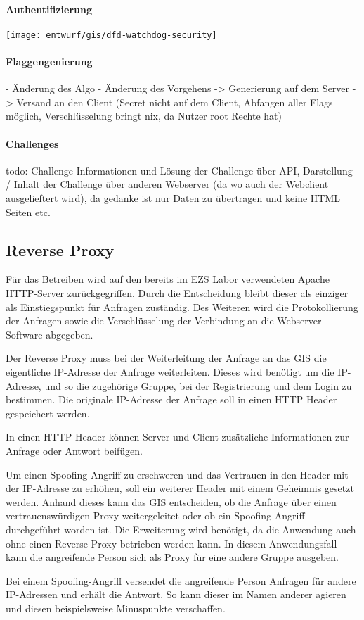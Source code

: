 \paragraph{Authentifizierung}

\texttt{[image: entwurf/gis/dfd-watchdog-security]}

\paragraph{Flaggengenierung}
- Änderung des Algo
- Änderung des Vorgehens -> Generierung auf dem Server -> Versand an den Client (Secret nicht auf dem Client, Abfangen aller Flags möglich, Verschlüsselung bringt nix, da Nutzer root Rechte hat)

\paragraph{Challenges}
todo:
Challenge Informationen und Lösung der Challenge über API, Darstellung / Inhalt der Challenge über anderen Webserver (da wo auch der Webclient ausgelieftert wird), da gedanke ist nur Daten zu übertragen und keine HTML Seiten etc.

\subsection{Reverse Proxy}
Für das Betreiben wird auf den bereits im EZS Labor verwendeten Apache HTTP-Server zurückgegriffen. Durch die Entscheidung bleibt dieser als einziger als Einstiegspunkt für Anfragen zuständig. Des Weiteren wird die Protokollierung der Anfragen sowie die Verschlüsselung der Verbindung an die Webserver Software abgegeben.

Der Reverse Proxy muss bei der Weiterleitung der Anfrage an das GIS die eigentliche IP-Adresse der Anfrage weiterleiten. Dieses wird benötigt um die IP-Adresse, und so die zugehörige Gruppe, bei der Registrierung und dem Login zu bestimmen. Die originale IP-Adresse der Anfrage soll in einen HTTP Header gespeichert werden.

In einen HTTP Header können Server und Client zusätzliche Informationen zur Anfrage oder Antwort beifügen. \cite{mdncontributorsHTTPHeaders2020}

Um einen Spoofing-Angriff zu erschweren und das Vertrauen in den Header mit der IP-Adresse zu erhöhen, soll ein weiterer Header mit einem Geheimnis gesetzt werden. Anhand dieses kann das GIS entscheiden, ob die Anfrage über einen vertrauenswürdigen Proxy weitergeleitet oder ob ein Spoofing-Angriff durchgeführt worden ist. Die Erweiterung wird benötigt, da die Anwendung auch ohne einen Reverse Proxy betrieben werden kann. In diesem Anwendungsfall kann die angreifende Person sich als Proxy für eine andere Gruppe ausgeben.

Bei einem Spoofing-Angriff versendet die angreifende Person Anfragen für andere IP-Adressen und erhält die Antwort. So kann dieser im Namen anderer agieren und diesen beispielsweise Minuspunkte verschaffen.
